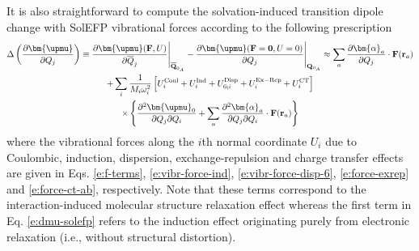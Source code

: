 \documentclass[b5paper,oneside,fleqn,11pt]{book}
\newcommand{\BM}[1]{\bm{#1}}
\newcommand{\fderiv}[2]{\ensuremath{
    \frac{\partial #1}{\partial #2}}}
\newcommand{\sderivd}[3]{\ensuremath{
    \frac{\partial^2 #1}{\partial #2 \partial #3}
    }}
\begin{document}
\begin{refsection}
It is also straightforward to compute the 
solvation\hyp{}induced transition dipole change
with SolEFP vibrational forces according to the following prescription
%
\begin{multline} \label{e:dmu-solefp}
\Delta\left(\frac{\partial{\BM \upmu}}{\partial Q_j}\right) \equiv 
 \frac{\partial{\BM \upmu}({\bf F},U)}{\partial\overline {Q}_j} \Bigg|_{\overline{\bf Q}_{0_A}} -  
 \frac{\partial{\BM \upmu}({\bf F}={\bf 0},U=0)}{\partial {Q}_j} \Bigg|_{{\bf Q}_{0_A}} \approx
%
\sum_a 
\fderiv{{\BM \alpha}_{a}}{Q_j} \cdot {\bf F}({\bf r}_a) \\
+
\sum_i 
\frac{1}{M_i\omega_i^2} 
\left[
 U^{\rm Coul}_i   + 
 U^{\rm Ind}_i    +
 U^{\rm Disp}_{6;i}   +
 U^{\rm Ex-Rep}_i +
 U^{\rm CT}_i
\right] \\\times
%
\left\{ 
 \sderivd{{\BM \upmu}_0}{Q_j}{Q_i} 
 + \sum_a \sderivd{{\BM \alpha}_{a}}{Q_j}{Q_i} \cdot {\bf F}({\bf r}_a)
%
\right\}  
\end{multline}
%
where the vibrational forces along the $i$th normal coordinate
$U_i$ due to Coulombic, induction, dispersion, exchange\hyp{}repulsion
and charge transfer effects are given in Eqs. \eqref{e:f-terms},
\eqref{e:vibr-force-ind}, \eqref{e:vibr-force-disp-6}, 
\eqref{e:force-exrep} and \eqref{e:force-ct-ab}, respectively.
Note that these terms correspond to the interaction\hyp{}induced
molecular structure relaxation effect
whereas the first term in Eq. \eqref{e:dmu-solefp}
refers to the induction effect originating purely from
electronic relaxation (i.e., without structural distortion).


\end{refsection}
\end{document}
